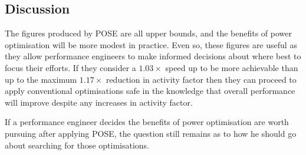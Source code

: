 \subsection{Discussion}


The figures produced by POSE are all upper bounds, and the benefits of power optimisation will be more modest in practice. Even so, these figures are useful as they allow performance engineers to make informed decisions about where best to focus their efforts. If they consider a $1.03 \times$ speed up to be more achievable than up to the maximum $1.17\times$ reduction in activity factor then they can proceed to apply conventional optimisations safe in the knowledge that overall performance will improve despite any increases in activity factor.

If a performance engineer decides the benefits of power optimisation are worth pursuing after applying POSE, the question still remains as to how he should go about searching for those optimisations.
